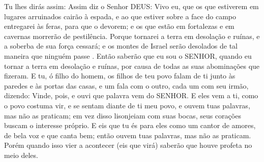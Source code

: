 {Tu lhes dirás assim: Assim diz o Senhor DEUS: Vivo eu, que os que estiverem em lugares arruinados cairão à espada, e ao que estiver sobre a face do campo entregarei às feras, para que o devorem; e os que estão em fortalezas e em cavernas morrerão de pestilência.
Porque tornarei a terra em desolação e ruínas, e a soberba de sua força cessará; e os montes de Israel serão desolados de tal maneira que ninguém passe
{} .
Então saberão que eu sou o SENHOR, quando eu tornar a terra em desolação e ruínas, por causa de todas as suas abominações que fizeram.
E tu, ó filho do homem, os filhos de teu povo falam de ti junto às paredes e às portas das casas, e um fala com o outro, cada um com seu irmão, dizendo: Vinde, pois, e ouvi que palavra vem do SENHOR.
E eles vem a ti, como o povo costuma vir, e se sentam diante de ti
{} meu povo, e ouvem tuas palavras, mas não as praticam; em vez disso lisonjeiam com suas bocas,
{} seus corações buscam o interesse próprio.
E eis que tu és para eles como um cantor de amores, de bela voz e que canta bem; então ouvem tuas palavras, mas não as praticam.
Porém quando isso vier a acontecer (eis que virá) saberão que houve profeta no meio deles.

}
